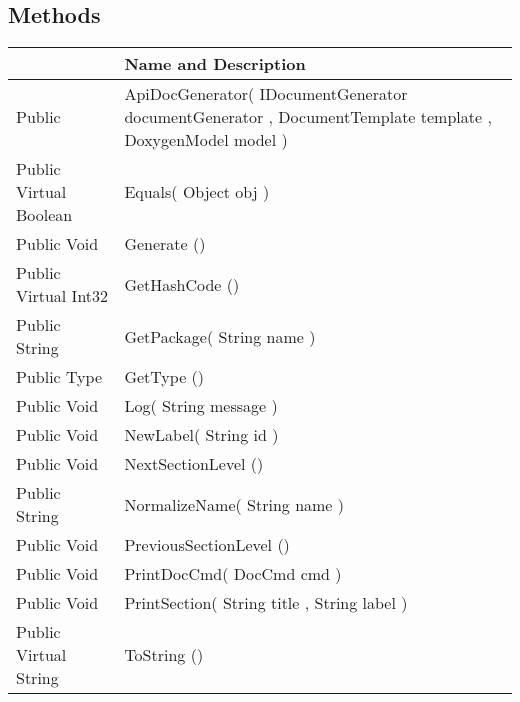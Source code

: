 \documentclass[11pt, oneside, a4paper]{book}
\begin{document}
\subsection{Methods}
\begin{center}
\begin{tabular}{| p{3cm} | p{12cm} | }
\hline
\textbf{ } & \textbf{ Name and Description}\\
\hline
 Public  &  ApiDocGenerator(\hypertarget{SoftwareEngineeringTools.{}Documentation.{}ApiDocGenerator.{}ApiDocGenerator\_IDocumentGenerator\_DocumentTemplate\_DoxygenModel}{} IDocumentGenerator  documentGenerator  ,  DocumentTemplate  template  ,  DoxygenModel  model  )\\
\hline
 Public  Virtual  Boolean &  Equals(\hypertarget{SoftwareEngineeringTools.{}Documentation.{}ApiDocGenerator.{}Equals\_Object}{} Object  obj  )\\
\hline
 Public  Void &  Generate ()\hypertarget{SoftwareEngineeringTools.{}Documentation.{}ApiDocGenerator.{}Generate}{}\\
\hline
 Public  Virtual  Int32 &  GetHashCode ()\hypertarget{SoftwareEngineeringTools.{}Documentation.{}ApiDocGenerator.{}GetHashCode}{}\\
\hline
 Public  String &  GetPackage(\hypertarget{SoftwareEngineeringTools.{}Documentation.{}ApiDocGenerator.{}GetPackage\_String}{} String  name  )\\
\hline
 Public  Type &  GetType ()\hypertarget{SoftwareEngineeringTools.{}Documentation.{}ApiDocGenerator.{}GetType}{}\\
\hline
 Public  Void &  Log(\hypertarget{SoftwareEngineeringTools.{}Documentation.{}ApiDocGenerator.{}Log\_String}{} String  message  )\\
\hline
 Public  Void &  NewLabel(\hypertarget{SoftwareEngineeringTools.{}Documentation.{}ApiDocGenerator.{}NewLabel\_String}{} String  id  )\\
\hline
 Public  Void &  NextSectionLevel ()\hypertarget{SoftwareEngineeringTools.{}Documentation.{}ApiDocGenerator.{}NextSectionLevel}{}\\
\hline
 Public  String &  NormalizeName(\hypertarget{SoftwareEngineeringTools.{}Documentation.{}ApiDocGenerator.{}NormalizeName\_String}{} String  name  )\\
\hline
 Public  Void &  PreviousSectionLevel ()\hypertarget{SoftwareEngineeringTools.{}Documentation.{}ApiDocGenerator.{}PreviousSectionLevel}{}\\
\hline
 Public  Void &  PrintDocCmd(\hypertarget{SoftwareEngineeringTools.{}Documentation.{}ApiDocGenerator.{}PrintDocCmd\_DocCmd}{} DocCmd  cmd  )\\
\hline
 Public  Void &  PrintSection(\hypertarget{SoftwareEngineeringTools.{}Documentation.{}ApiDocGenerator.{}PrintSection\_String\_String}{} String  title  ,  String  label  )\\
\hline
 Public  Virtual  String &  ToString ()\hypertarget{SoftwareEngineeringTools.{}Documentation.{}ApiDocGenerator.{}ToString}{}\\
\hline
\end{tabular}
\end{center}
 
\end{document}
